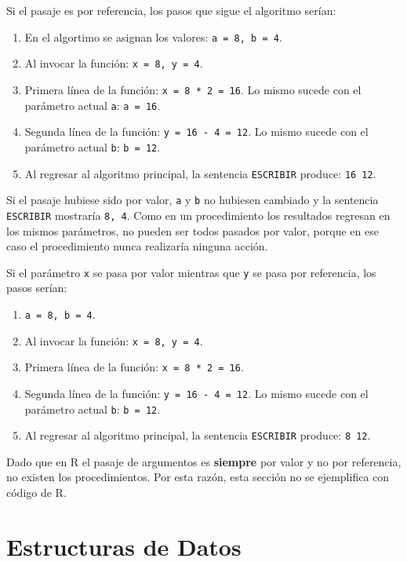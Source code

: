 \documentclass[
]{book}
\providecommand{\tightlist}{%
  \setlength{\itemsep}{0pt}\setlength{\parskip}{0pt}}
\begin{document}
Si el pasaje es por referencia, los pasos que sigue el algoritmo serían:

\begin{enumerate}
\def\labelenumi{\arabic{enumi}.}
\tightlist
\item
  En el algortimo se asignan los valores: \texttt{a\ =\ 8,\ b\ =\ 4}.
\item
  Al invocar la función: \texttt{x\ =\ 8,\ y\ =\ 4}.
\item
  Primera línea de la función: \texttt{x\ =\ 8\ *\ 2\ =\ 16}. Lo mismo sucede con el parámetro actual \texttt{a}: \texttt{a\ =\ 16}.
\item
  Segunda línea de la función: \texttt{y\ =\ 16\ -\ 4\ =\ 12}. Lo mismo sucede con el parámetro actual \texttt{b}: \texttt{b\ =\ 12}.
\item
  Al regresar al algoritmo principal, la sentencia \texttt{ESCRIBIR} produce: \texttt{16\ 12}.
\end{enumerate}

Si el pasaje hubiese sido por valor, \texttt{a} y \texttt{b} no hubiesen cambiado y la sentencia \texttt{ESCRIBIR} mostraría \texttt{8,\ 4}. Como en un procedimiento los resultados regresan en los mismos parámetros, no pueden ser todos pasados por valor, porque en ese caso el procedimiento nunca realizaría ninguna acción.

Si el parámetro \texttt{x} se pasa por valor mientras que \texttt{y} se pasa por referencia, los pasos serían:

\begin{enumerate}
\def\labelenumi{\arabic{enumi}.}
\tightlist
\item
  \texttt{a\ =\ 8,\ b\ =\ 4}.
\item
  Al invocar la función: \texttt{x\ =\ 8,\ y\ =\ 4}.
\item
  Primera línea de la función: \texttt{x\ =\ 8\ *\ 2\ =\ 16}.
\item
  Segunda línea de la función: \texttt{y\ =\ 16\ -\ 4\ =\ 12}. Lo mismo sucede con el parámetro actual \texttt{b}: \texttt{b\ =\ 12}.
\item
  Al regresar al algoritmo principal, la sentencia \texttt{ESCRIBIR} produce: \texttt{8\ 12}.
\end{enumerate}

Dado que en R el pasaje de argumentos es \textbf{siempre} por valor y no por referencia, no existen los procedimientos. Por esta razón, esta sección no se ejemplifica con código de R.

\hypertarget{estructuras-de-datos}{%
\chapter{Estructuras de Datos}\label{estructuras-de-datos}}
\end{document}
